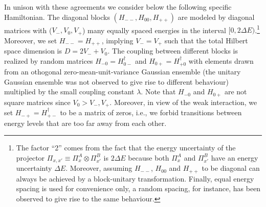\documentclass[pre,onecolumn,12pt,aps,longbibliography,nofootinbib]{revtex4-2}
\begin{document}
In unison with these agreements we consider below the following specific Hamiltonian. The diagonal blocks
$(H_{--},H_{00},H_{++})$ are modeled by diagonal matrices with ($V_-,V_0,V_+$) many equally spaced energies in the
interval $[0,2\Delta E)$.\footnote{The factor ``2'' comes from the fact that the energy uncertainty of the projector
$\Pi_{x,x'} \equiv \Pi_x^A\otimes\Pi_{x'}^B$ is $2\Delta E$ because both $\Pi_x^A$ and $\Pi_{x'}^B$ have an energy
uncertainty $\Delta E$. Moreover, assuming $H_{--}$, $H_{00}$ and $H_{++}$ to be diagonal can always be achieved by a
block-unitary transformation. Finally, equal energy spacing is used for convenience only, a random spacing, for instance,
has been observed to give rise to the same behaviour.} Moreover, we set $H_{--} = H_{++}$, implying $V_-=V_+$ such that
the total Hilbert space dimension is $D=2V_- + V_0$. The coupling between different blocks is realized by random
matrices $H_{-0} = H_{0-}^\dagger$ and $H_{0+} = H_{+0}^\dagger$ with elements drawn from an othogonal
zero-mean-unit-variance Gaussian ensemble (the unitary Gaussian ensemble was not observed to give rise to different  behaviour) multiplied by the small coupling constant $\lambda$. Note that $H_{-0}$ and $H_{0+}$ are not square
matrices since $V_0 > V_-,V_+$. Moreover, in view of the weak interaction, we set $H_{-+} = H_{+-}^\dagger$ to be a
matrix of zeros, i.e., we forbid transitions between energy levels that are too far away from each other.
\end{document}
